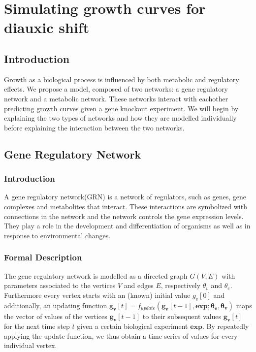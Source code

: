 \chapter{Simulating growth curves for diauxic shift}\label{chap:sim}
\section{Introduction}
Growth as a biological process is influenced by both metabolic and regulatory effects. 
We propose a model, composed of two networks: a gene regulatory network and a metabolic network. These networks interact with eachother 
predicting growth curves given a gene knockout experiment. We will begin by explaining the two types of networks and
how they are modelled individually before explaining the interaction between the two networks.
\section{Gene Regulatory Network}
\subsection{Introduction}
A gene regulatory network(GRN) is a network of regulators, such as genes, gene complexes and metabolites that interact. These interactions are symbolized
with connections in the network and the network controls the gene expression levels. They play a role in the development and differentiation of organisms
as well as in response to environmental changes.
\subsection{Formal Description}
The gene regulatory network is modelled as a directed graph $G(V,E)$ with parameters associated to the vertices $V$ and edges $E$, respectively $\theta_v$ and $\theta_e$. 
Furthermore every vertex starts with an (known)
initial value $g_v[0]$ and additionally, an updating function $\mathbf{g_v}[t] = f_{update}(\mathbf{g_v}[t-1], \mathbf{exp};\boldsymbol{\theta_e}, \boldsymbol{\theta_v})$ maps
the vector of values of the vertices $\mathbf{g_v}[t-1]$ to their subsequent values $\mathbf{g_v}[t]$ for the next time step $t$ given a certain biological experiment $\mathbf{exp}$. 
By repeatedly applying the update function, we thus obtain a time series of values for every individual vertex. 
